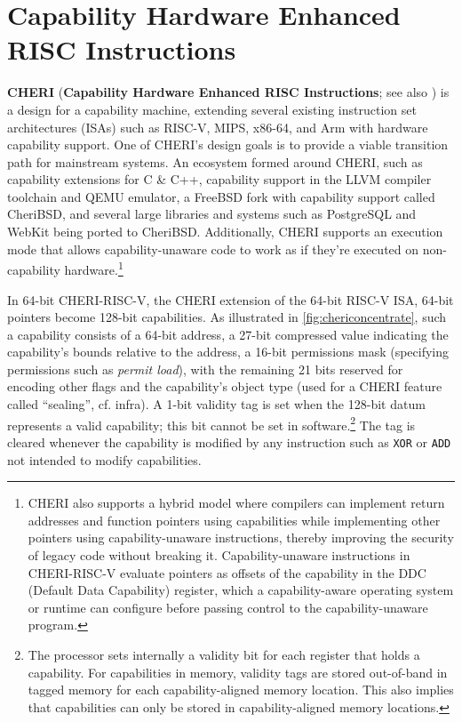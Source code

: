 \documentclass[main.tex]{subfiles}
\begin{document}
\section{Capability Hardware Enhanced RISC Instructions}
\textbf{CHERI} (\textbf{Capability Hardware Enhanced RISC Instructions}; see also \citet{intro2cheri}) is a design for a capability machine, extending several existing instruction set architectures (ISAs) such as RISC-V, MIPS, x86-64, and Arm with hardware capability support. One of CHERI’s design goals is to provide a viable transition path for mainstream systems. An ecosystem formed around CHERI, such as capability extensions for C \& C++, capability support in the LLVM compiler toolchain and QEMU emulator, a FreeBSD fork with capability support called CheriBSD, and several large libraries and systems such as PostgreSQL and WebKit being ported to CheriBSD. Additionally, CHERI supports an execution mode that allows capability-unaware code to work as if they're executed on non-capability hardware.\footnote{CHERI also supports a hybrid model where compilers can implement return addresses and function pointers using capabilities while implementing other pointers using capability-unaware instructions, thereby improving the security of legacy code without breaking it. Capability-unaware instructions in CHERI-RISC-V evaluate pointers as offsets of the capability in the DDC (Default Data Capability) register, which a capability-aware operating system or runtime can configure before passing control to the capability-unaware program.}

In 64-bit CHERI-RISC-V, the CHERI extension of the 64-bit RISC-V ISA, 64-bit pointers become 128-bit capabilities. As illustrated in \cref{fig:chericoncentrate}, such a capability consists of a 64-bit address, a 27-bit compressed value indicating the capability’s bounds relative to the address, a 16-bit permissions mask (specifying permissions such as \emph{permit load}), with the remaining 21 bits reserved for encoding other flags and the capability’s object type (used for a CHERI feature called \enquote{\gls*{sealing}}, cf. infra). A 1-bit validity tag is set when the 128-bit datum represents a valid capability; this bit cannot be set in software.\footnote{The processor sets internally a validity bit for each register that holds a capability. For capabilities in memory, validity tags are stored out-of-band in tagged memory for each capability-aligned memory location. This also implies that capabilities can only be stored in capability-aligned memory locations.} The tag is cleared whenever the capability is modified by any instruction such as \texttt{XOR} or \texttt{ADD} not intended to modify capabilities.
\end{document}
